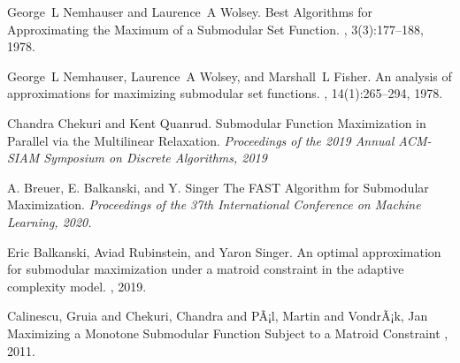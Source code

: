 \documentclass[11pt, a4paper]{article}
\begin{document}
\begin{thebibliography}{99}
    George~L Nemhauser and Laurence~A Wolsey.
	\newblock Best Algorithms for Approximating the Maximum of a Submodular Set Function.
	, 3(3):177--188, 1978.
	
    George~L Nemhauser, Laurence~A Wolsey, and Marshall~L Fisher.
    \newblock An analysis of approximations for maximizing submodular set functions.
    , 14(1):265--294, 1978.

	
     Chandra Chekuri and Kent Quanrud.
	\newblock Submodular Function Maximization in Parallel via the Multilinear Relaxation.
	\newblock \emph{Proceedings of the 2019 Annual ACM-SIAM Symposium on Discrete Algorithms, 2019}

     A. Breuer, E. Balkanski, and Y. Singer
	\newblock The FAST Algorithm for Submodular Maximization.
	\newblock \emph{Proceedings of the 37th International Conference on Machine Learning, 2020.}
	
	 Eric Balkanski, Aviad Rubinstein, and Yaron Singer.
	\newblock An optimal approximation for submodular maximization under a matroid constraint in the adaptive complexity model.
	, 2019.
	
	Calinescu, Gruia and Chekuri, Chandra and PÃ¡l, Martin and VondrÃ¡k, Jan
	\newblock Maximizing a Monotone Submodular Function Subject to a Matroid Constraint
	, 2011.
	

\end{thebibliography}
\end{document}
